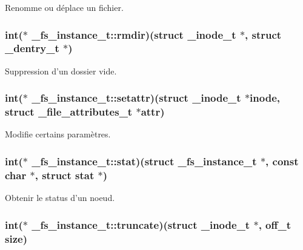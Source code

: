 \-Renomme ou déplace un fichier. \hypertarget{struct__fs__instance__t_a4ceb71ff00d0a5fda03aa644c4694bef}{
\subsubsection[{rmdir}]{\setlength{\rightskip}{0pt plus 5cm}int($\ast$ {\bf \-\_\-fs\-\_\-instance\-\_\-t\-::rmdir})(struct {\bf \-\_\-inode\-\_\-t} $\ast$, struct {\bf \-\_\-dentry\-\_\-t} $\ast$)}}\label{struct__fs__instance__t_a4ceb71ff00d0a5fda03aa644c4694bef}
\-Suppression d'un dossier vide. \hypertarget{struct__fs__instance__t_ae76a7f1f9c4653baa497343bf26918a6}{
\subsubsection[{setattr}]{\setlength{\rightskip}{0pt plus 5cm}int($\ast$ {\bf \-\_\-fs\-\_\-instance\-\_\-t\-::setattr})(struct {\bf \-\_\-inode\-\_\-t} $\ast$inode, struct {\bf \-\_\-file\-\_\-attributes\-\_\-t} $\ast$attr)}}\label{struct__fs__instance__t_ae76a7f1f9c4653baa497343bf26918a6}
\-Modifie certains paramètres. \hypertarget{struct__fs__instance__t_a2c6e81a4cb02717c82587c1995947e56}{
\subsubsection[{stat}]{\setlength{\rightskip}{0pt plus 5cm}int($\ast$ {\bf \-\_\-fs\-\_\-instance\-\_\-t\-::stat})(struct {\bf \-\_\-fs\-\_\-instance\-\_\-t} $\ast$, const char $\ast$, struct {\bf stat} $\ast$)}}\label{struct__fs__instance__t_a2c6e81a4cb02717c82587c1995947e56}
\-Obtenir le status d'un noeud. \hypertarget{struct__fs__instance__t_a02c8b56a14997bf58d8350a26e441954}{
\subsubsection[{truncate}]{\setlength{\rightskip}{0pt plus 5cm}int($\ast$ {\bf \-\_\-fs\-\_\-instance\-\_\-t\-::truncate})(struct {\bf \-\_\-inode\-\_\-t} $\ast$, off\-\_\-t size)}}\label{struct__fs__instance__t_a02c8b56a14997bf58d8350a26e441954}
